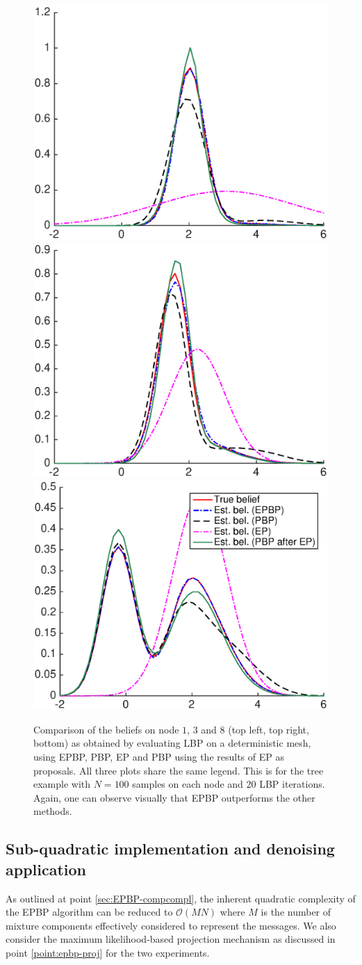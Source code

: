 \begin{figure}[!h]
\center
	\includegraphics[width=.48\textwidth]{figures/epbp/tree_node1}
	\includegraphics[width=.48\textwidth]{figures/epbp/tree_node3}
	\includegraphics[width=.48\textwidth]{figures/epbp/tree_node8}

	\caption{\label{compTree}Comparison of the beliefs on node $1$, $3$ and $8$ (top left, top right, bottom) as obtained by evaluating LBP on a deterministic mesh, using EPBP, PBP, EP and PBP using the results of EP as proposals. All three plots share the same legend. This is for the tree example with $N=100$ samples on each node and $20$ LBP iterations. Again, one can observe visually that EPBP outperforms the other methods. }
\end{figure}

\subsection{Sub-quadratic implementation and denoising application}
As outlined at point \ref{sec:EPBP-compcompl}, the inherent quadratic complexity of the EPBP algorithm can be reduced to $\mathcal O(MN)$ where $M$ is the number of mixture components effectively considered to represent the messages. We also consider the maximum likelihood-based projection mechanism as discussed in point \ref{point:epbp-proj} for the two experiments.

